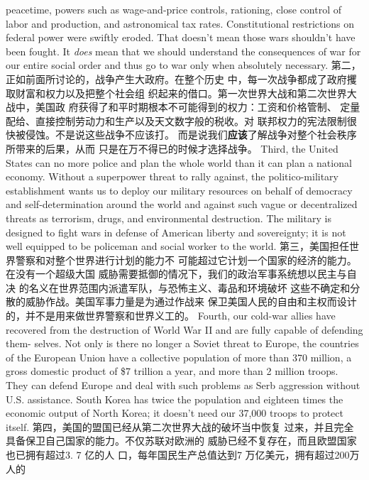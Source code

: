 \begin{paracol}{2}
peacetime, powers such as wage-and-price controls, rationing,
close control of labor and production, and astronomical tax
rates. Constitutional restrictions on federal power were swiftly
eroded. That doesn't mean those wars shouldn't have been
fought. It \textit{does} mean that we should understand the consequences of war for our entire social order and thus go to war
only when absolutely necessary.
\switchcolumn
第二，正如前面所讨论的，战争产生大政府。在整个历史
中，每一次战争都成了政府攫取财富和权力以及把整个社会组
织起来的借口。第一次世界大战和第二次世界大战中，美国政
府获得了和平时期根本不可能得到的权力：工资和价格管制、
定量配给、直接控制劳动力和生产以及天文数字般的税收。对
联邦权力的宪法限制很快被侵蚀。不是说这些战争不应该打。
而是说我们\textbf{应该}了解战争对整个社会秩序所带来的后果，从而
只是在万不得已的时候才选择战争。
\switchcolumn*
Third, the United States can no more police and plan the
whole world than it can plan a national economy. Without a superpower threat to rally against, the politico-military establishment wants us to deploy our military resources on behalf of
democracy and self-determination around the world and
against such vague or decentralized threats as terrorism, drugs,
and environmental destruction. The military is designed to
fight wars in defense of American liberty and sovereignty; it is
not well equipped to be policeman and social worker to the
world.
\switchcolumn
第三，美国担任世界警察和对整个世界进行计划的能力不
可能超过它计划一个国家的经济的能力。在没有一个超级大国
威胁需要抵御的情况下，我们的政治军事系统想以民主与自决
的名义在世界范围内派遣军队，与恐怖主义、毒品和环境破坏
这些不确定和分散的威胁作战。美国军事力量是为通过作战来
保卫美国人民的自由和主权而设计的，并不是用来做世界警察和世界义工的。
\switchcolumn*
Fourth, our cold-war allies have recovered from the destruction of World War II and are fully capable of defending them-
selves. Not only is there no longer a Soviet threat to Europe, the
countries of the European Union have a collective population of
more than 370 million, a gross domestic product of \$7 trillion a
year, and more than 2 million troops. They can defend Europe
and deal with such problems as Serb aggression without U.S.
assistance. South Korea has twice the population and eighteen
times the economic output of North Korea; it doesn't need our
37,000 troops to protect itself.
\switchcolumn
第四，美国的盟国已经从第二次世界大战的破坏当中恢复
过来，并且完全具备保卫自己国家的能力。不仅苏联对欧洲的
威胁已经不复存在，而且欧盟国家也已拥有超过3. 7 亿的人
口，每年国民生产总值达到7 万亿美元，拥有超过200万人的

\end{paracol}
